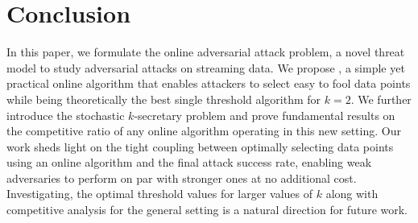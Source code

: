 \section{Conclusion}
In this paper, we formulate the online adversarial attack problem, a novel threat model to study adversarial attacks on streaming data. We propose \algoname, a simple yet practical online algorithm that enables attackers to select easy to fool data points while being theoretically the best single threshold algorithm for $k=2$. We further introduce the stochastic $k$-secretary problem and prove fundamental results on the competitive ratio of any online algorithm operating in this new setting. Our work sheds light on the tight coupling between optimally selecting data points using an online algorithm and the final attack success rate, enabling weak adversaries to perform on par with stronger ones at no additional cost. Investigating, the optimal threshold values for larger values of $k$ along with competitive analysis for the general setting is a natural direction for future work.  
